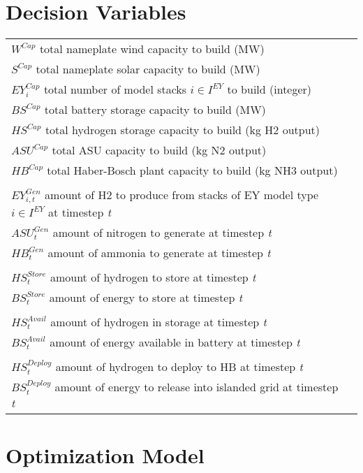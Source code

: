 \documentclass[12 pt]{article}
\begin{document}
\section*{Decision Variables}
\begin{tabular}{ll}
$W^{Cap}$ total nameplate wind capacity to build (MW)\\
$S^{Cap}$ total nameplate solar capacity to build (MW)\\
$EY^{Cap}_{i}$ total number of model stacks $i \in I^{EY}$ to build (integer)\\
$BS^{Cap}$ total battery storage capacity to build (MW)\\
$HS^{Cap}$ total hydrogen storage capacity to build (kg H2 output)\\
$ASU^{Cap}$ total ASU capacity to build (kg N2 output)\\
$HB^{Cap}$ total Haber-Bosch plant capacity to build (kg NH3 output)\\
\\

$EY^{Gen}_{i,t}$ amount of H2 to produce from stacks of EY model type $i \in I^{EY}$ at timestep \textit{t} \\
$ASU^{Gen}_{t}$ amount of nitrogen to generate at timestep \textit{t} \\
$HB^{Gen}_{t}$ amount of ammonia to generate at timestep \textit{t} \\
\\
$HS^{Store}_{t}$ amount of hydrogen to store at timestep \textit{t} \\
$BS^{Store}_{t}$ amount of energy to store at timestep \textit{t} \\
\\
$HS^{Avail}_{t}$ amount of hydrogen in storage at timestep \textit{t} \\
$BS^{Avail}_{t}$ amount of energy available in battery at timestep \textit{t} \\
\\
$HS^{Deploy}_{t}$ amount of hydrogen to deploy to HB at timestep \textit{t} \\
$BS^{Deploy}_{t}$ amount of energy to release into islanded grid at timestep \textit{t} \\

\end{tabular}






\section*{Optimization Model}
\end{document}
